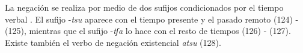 La negación se realiza por medio de dos sufijos condicionados por el tiempo verbal \textcolor{MidnightBlue}{\citep{aguaruna}}. El sufijo {\setmainfont{Charis SIL} -\textit{tsu}} aparece con el tiempo presente y el pasado remoto (124) - (125), mientras que el sufijo {\setmainfont{Charis SIL} -\textit{tʃa}} lo hace con el resto de tiempos (126) - (127). Existe también el verbo de negación existencial {\setmainfont{Charis SIL} \textit{atsu}} (128).
